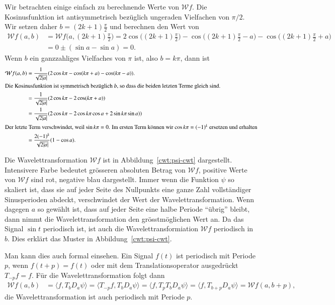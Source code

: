 \begin{beispiel}
Wir betrachten einige einfach zu berechnende Werte von $\mathcal{W}f$.
Die Kosinusfunktion ist antisymmetrisch bezüglich ungeraden Vielfachen
von $\pi/2$.
Wir setzen daher $b=(2k+1)\frac{\pi}2$ und berechnen den Wert von
\begin{align*}
\mathcal{W}f(a,b)
&=
\mathcal{W}f\biggl(a,(2k+1)\frac{\pi}2\biggr)
=
2\cos\biggl((2k+1)\frac{\pi}2\biggr)
-\cos\biggl((2k+1)\frac{\pi}2 -a\biggr)
-\cos\biggl((2k+1)\frac{\pi}2 +a\biggr)
\\
&=
0
\pm(\sin a - \sin a)
=0.
\end{align*}
Wenn $b$ ein ganzzahliges Vielfaches von $\pi$ ist, also $b=k\pi$, dann ist 
\begin{align*}
\mathcal{W}f(a,b)
&=
\frac{1}{\sqrt{2|a|}}(2\cos k\pi - \cos(k\pi +a) -\cos(k\pi-a)).
\\
\intertext{Die Kosinusfunktion ist symmetrisch bezüglich $b$, so dass die
beiden letzten Terme gleich sind.  }
&=
\frac{1}{\sqrt{2|a|}}(2\cos k\pi - 2\cos(k\pi +a))
\\
&=
\frac{1}{\sqrt{2|a|}}(2\cos k\pi - 2\cos k\pi \cos a + 2 \sin k\pi \sin a))
\\
\intertext{Der letzte Term verschwindet, weil $\sin k\pi=0$.
Im ersten Term können wir $\cos k\pi=(-1)^k$ ersetzen und erhalten}
&=
\frac{2(-1)^k}{\sqrt{2|a|}}(1 - \cos a).
\end{align*}

Die Wavelettransformation $\mathcal{W}f$ ist in Abbildung~\ref{cwt:psi-cwt}
dargestellt.
Intensivere Farbe bedeutet grösseren absoluten Betrag von $\mathcal{W}f$,
positive Werte von $\mathcal{W}f$ sind rot, negative blau dargestellt.
Immer wenn die Funktion $\psi$ so skaliert ist, dass sie auf jeder
Seite des Nullpunkts eine ganze Zahl vollständiger Sinusperioden abdeckt,
verschwindet der Wert der Wavelettransformation.
Wenn dagegen $a$ so gewählt ist, dass auf jeder Seite eine halbe Periode
``übrig'' bleibt, dann nimmt die Wavelettransformation den grösstmöglichen
Wert an.
Da das Signal $\sin t$ periodisch ist, ist auch die Wavelettransformiation
$\mathcal{W}f$ periodisch in $b$.
Dies erklärt das Muster in Abbildung~\ref{cwt:psi-cwt}.

Man kann dies auch formal einsehen. 
Ein Signal $f(t)$ ist periodisch mit Periode $p$, wenn $f(t+p) = f(t)$
oder mit dem Translationsoperator ausgedrückt $T_{-p}f=f$.
Für die Wavelettransformation folgt dann
\begin{align*}
\mathcal{W}f(a,b)
&=
\langle f,T_bD_a\psi\rangle
=
\langle T_{-p}f,T_bD_a\psi\rangle
=
\langle f,T_pT_bD_a\psi\rangle
=
\langle f, T_{b+p}D_a\psi\rangle
=
\mathcal{W}f(a,b+p),
\end{align*}
die Wavelettransformation ist auch periodisch mit Periode $p$.
\end{beispiel}

